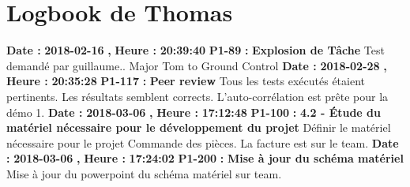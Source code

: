\documentclass{article}%
\begin{document}
\section{Logbook de Thomas}%
\textbf{Date : }%
\textbf{2018{-}02{-}16}%
\textbf{,}%
\textbf{ Heure : }%
\textbf{20:39:40}%
\newline%
%
\textbf{P1{-}89 }%
\textbf{ : }%
\textbf{ Explosion de Tâche}%
\newline%
\newline%
%
Test demandé par guillaume.. Major Tom to Ground Control\newline%
\newline%
%
\textbf{Date : }%
\textbf{2018{-}02{-}28}%
\textbf{,}%
\textbf{ Heure : }%
\textbf{20:35:28}%
\newline%
%
\textbf{P1{-}117 }%
\textbf{ : }%
\textbf{ Peer review}%
\newline%
\newline%
%
Tous les tests exécutés étaient pertinents. Les résultats semblent corrects. L'auto{-}corrélation est prête pour la démo 1.\newline%
\newline%
%
\textbf{Date : }%
\textbf{2018{-}03{-}06}%
\textbf{,}%
\textbf{ Heure : }%
\textbf{17:12:48}%
\newline%
%
\textbf{P1{-}100 }%
\textbf{ : }%
\textbf{ 4.2 {-} Étude du matériel nécessaire pour le développement du projet}%
\newline%
\newline%
%
Définir le matériel nécessaire pour le projet\newline%
Commande des pièces.\newline%
La facture est sur le team.\newline%
\newline%
%
\textbf{Date : }%
\textbf{2018{-}03{-}06}%
\textbf{,}%
\textbf{ Heure : }%
\textbf{17:24:02}%
\newline%
%
\textbf{P1{-}200 }%
\textbf{ : }%
\textbf{ Mise à jour du schéma matériel}%
\newline%
\newline%
%
Mise à jour du powerpoint du schéma matériel sur team.\newline%
\newline%
%
\newpage

%
\end{document}
